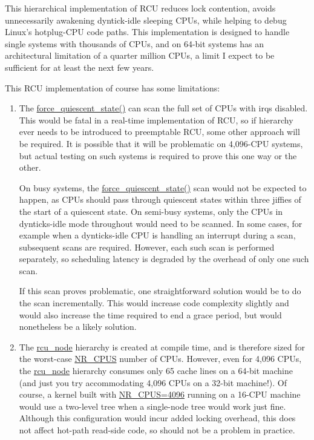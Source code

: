 This hierarchical implementation of RCU reduces lock contention,
avoids unnecessarily awakening dyntick-idle sleeping CPUs, while
helping to debug Linux's hotplug-CPU code paths.
This implementation is designed to handle single systems with
thousands of CPUs, and on 64-bit systems has an architectural
limitation of a quarter million CPUs, a limit I expect to be
sufficient for at least the next few years.

This RCU implementation of course has some limitations:

\begin{enumerate}
\item	The \url{force_quiescent_state()} can scan the full
	set of CPUs with irqs disabled.
	This would be fatal in a real-time implementation of RCU,
	so if hierarchy ever needs to be introduced to preemptable
	RCU, some other approach will be required.
	It is possible that it will be problematic on 4,096-CPU
	systems, but actual testing on such systems is required
	to prove this one way or the other.
	
	On busy systems, the \url{force_quiescent_state()} scan
	would not be expected to happen,
	as CPUs should pass through quiescent states within three
	jiffies of the start of a quiescent state.  On semi-busy
	systems, only the CPUs in dynticks-idle mode throughout would
	need to be scanned.
	In some cases, for example when a dynticks-idle CPU is handling
	an interrupt during a scan, subsequent scans are required.
	However, each such scan is performed separately, so scheduling
	latency is degraded by the overhead of only one such scan.
	
	If this scan proves problematic, one straightforward solution
	would be to do the scan incrementally.
	This would increase code complexity slightly and would also
	increase the time required to end a grace period, but would
	nonetheless be a likely solution.
	
\item	The \url{rcu_node} hierarchy is created at compile
	time, and is therefore sized for the worst-case \url{NR_CPUS}
	number of CPUs.
	However, even for 4,096 CPUs, the \url{rcu_node}
	hierarchy consumes only 65 cache lines on a 64-bit machine
	(and just you try accommodating 4,096 CPUs on a 32-bit machine!).
	Of course, a kernel built with \url{NR_CPUS=4096}
	running on a 16-CPU machine would use a two-level tree when
	a single-node tree would work just fine.
	Although this configuration would incur added locking overhead,
	this does not affect hot-path read-side code, so should not be a
	problem in practice.
	

\end{enumerate}
